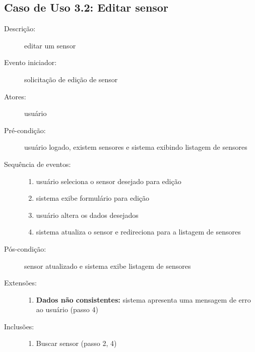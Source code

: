 \subsection{Caso de Uso 3.2: Editar sensor}
\begin{description}
	\item[Descrição:] editar um sensor
	\item[Evento iniciador:] solicitação de edição de sensor
	\item[Atores:] usuário
	\item[Pré-condição:] usuário logado, existem sensores e sistema exibindo listagem de sensores
	\item[Sequência de eventos:] \hfill
		\begin{enumerate}
			\item{usuário seleciona o sensor desejado para edição}
			\item{sistema exibe formulário para edição}
			\item{usuário altera os dados desejados}
			\item{sistema atualiza o sensor e redireciona para a listagem de sensores}
		\end{enumerate}
	\item[Pós-condição:] sensor atualizado e sistema exibe listagem de sensores
	\item[Extensões:] \hfill
		\begin{enumerate}
			\item{\textbf{Dados não consistentes:} sistema apresenta uma mensagem de erro ao usuário (passo 4)}
		\end{enumerate}
	\item[Inclusões:] \hfill
		\begin{enumerate}
			\item{Buscar sensor (passo 2, 4)}
		\end{enumerate}
\end{description}
%
